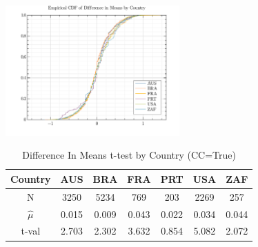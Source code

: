 \documentclass{article}
\begin{document}

\includegraphics[width=0.5\textwidth]{./visuals/ttests/CCtrue/EmpDiffInMeansCDF.png}
\begin{table}
\caption{Difference In Means t-test by Country (CC=True)}
\label{DiffInMeansttestsCCtrue}
\begin{center} \begin{tabular}{|c|c|c|c|c|c|c|} \hline
Country & AUS & BRA & FRA & PRT & USA & ZAF  \\ \hline
N & 3250 & 5234 & 769 & 203 & 2269 & 257  \\ \hline
$\hat{\mu}$ & 0.015 & 0.009 & 0.043 & 0.022 & 0.034 & 0.044  \\ \hline
t-val  & 2.703 & 2.302 & 3.632 & 0.854 & 5.082 & 2.072  \\ \hline
\end{tabular} \end{center}
\end{table}

\end{document}
